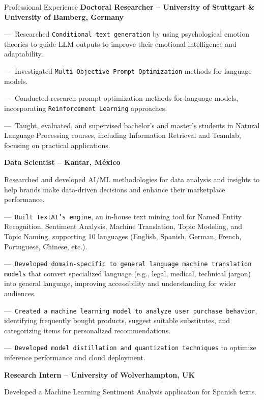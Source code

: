 \begin{rubric}{Professional Experience}
\entry*[04.2022 -- Present]%
	\textbf{Doctoral Researcher -- University of Stuttgart \& University of Bamberg, Germany}
	
---~Researched \texttt{Conditional text generation} by using psychological emotion theories to guide LLM outputs to improve their emotional intelligence and adaptability.\par\par

 ---~Investigated \texttt{Multi-Objective Prompt Optimization} methods for language models.\par\par

 ---~Conducted research prompt optimization methods for language models, incorporating \texttt{Reinforcement Learning} approaches.\par\par
 
---~Taught, evaluated, and supervised bachelor's and master's students in Natural Language Processing courses, including Information Retrieval and Teamlab, focusing on practical applications.\par\par

\entry*[06.2018 -- 09.2021]%
	\textbf{Data Scientist -- Kantar, México}
 
Researched and developed AI/ML methodologies for data analysis and insights to help brands make data-driven decisions and enhance their marketplace performance.\par\par
%
---~\texttt{Built TextAI’s engine}, an in-house text mining tool for Named Entity Recognition, Sentiment Analysis, Machine Translation, Topic Modeling, and Topic Naming, supporting 10 languages (English, Spanish, German, French, Portuguese, Chinese, etc.).\par

---~\texttt{Developed domain-specific to general language machine translation models} that convert specialized language (e.g., legal, medical, technical jargon) into general language, improving accessibility and understanding for wider audiences.\par

---~\texttt{Created a machine learning model to analyze user purchase behavior}, identifying frequently bought products, suggest suitable substitutes, and categorizing items for personalized recommendations.\par
---~\texttt{Developed model distillation and quantization techniques} to optimize inference performance and cloud deployment.

%
%
\entry*[02.2017 -- 08.2017]%
	\textbf{Research Intern -- University of Wolverhampton, UK}
 
 Developed a Machine Learning Sentiment Analysis application for Spanish texts.
%
\end{rubric}